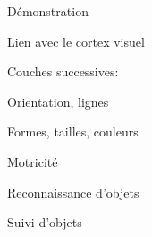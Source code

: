 \begin{frame}{Démonstration}
\end{frame}

\begin{frame}{Lien avec le cortex visuel}
  \begin{minipage}[l]{0.50\linewidth}
  \end{minipage}\hfill
  \begin{minipage}[l]{0.49\linewidth}
    Couches successives:
    \begin{description}[<+(1)->]
    \item[V1] Orientation, lignes
    \item[V2] Formes, tailles, couleurs
    \item[V3] Motricité
    \item[V4] Reconnaissance d'objets
    \item[V5] Suivi d'objets
    \end{description}
  \end{minipage}\hfill
\end{frame}
